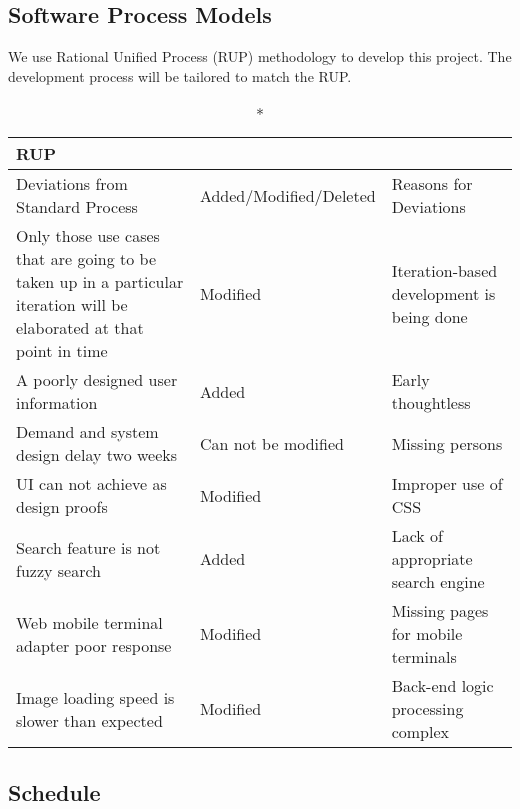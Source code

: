 \documentclass[a4paper,11pt]{article}
\begin{document}
\subsection{Software Process Models}

We use Rational Unified Process (RUP) methodology to develop this project.
The development process will be tailored to match the RUP. 
\begin{center}
\begin{longtable}{|L|L|L|}
\caption*{RUP} \\
\hline Deviations from Standard Process            & Added/Modified/Deleted & Reasons for Deviations \\
\hline Only those use cases that are going to be 
taken up in a particular iteration will be 
elaborated at that point in time                   & Modified               & Iteration-based development is being done \\
\hline A poorly designed user information          & Added                  & Early thoughtless \\
\hline Demand and system design delay two weeks    & Can not be modified    & Missing persons \\
\hline UI can not achieve as design proofs         & Modified               & Improper use of CSS \\
\hline Search feature is not fuzzy search          & Added                  & Lack of appropriate search engine \\
\hline Web mobile terminal adapter poor response   & Modified               & Missing pages for mobile terminals \\
\hline Image loading speed is slower than expected & Modified               & Back-end logic processing complex \\
\hline 
\end{longtable}
\end{center}

\subsection{Schedule}
\end{document}
